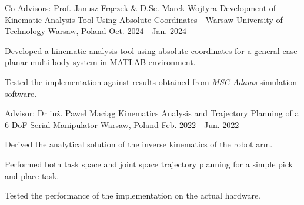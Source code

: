 

\begin{cventries}

  \cventry
    {Co-Advisors: Prof. Janusz Fr\k{a}czek \& D.Sc. Marek Wojtyra} %
    {Development of Kinematic Analysis Tool Using Absolute Coordinates - Warsaw University of Technology} %
    {Warsaw, Poland} %
    {Oct. 2024 - Jan. 2024} %
    {
      \begin{cvitems} %
        \item {Developed a kinematic analysis tool using absolute coordinates for a general case planar multi-body system in MATLAB environment.}
        \item {Tested the implementation against results obtained from \emph{MSC Adams} simulation software.}
      \end{cvitems}
    }

  \cventry
    {Advisor: Dr inż. Paweł Maci\k{a}g} %
    {Kinematics Analysis and Trajectory Planning of a 6 DoF Serial Manipulator} %
    {Warsaw, Poland} %
    {Feb. 2022 - Jun. 2022} %
    {
      \begin{cvitems} %
        \item {Derived the analytical solution of the inverse kinematics of the robot arm.}
        \item {Performed both task space and joint space trajectory planning for a simple pick and place task.}
        \item {Tested the performance of the implementation on the actual hardware.}
      \end{cvitems}
    }


\end{cventries}
